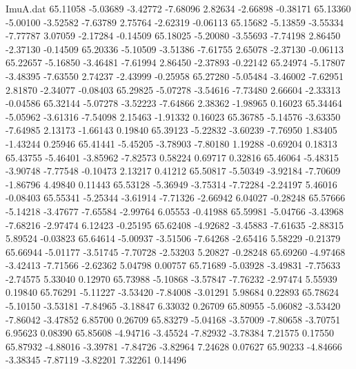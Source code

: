 \begin{filecontents}{ImuA.dat}
  65.11058   -5.03689   -3.42772   -7.68096    2.82634   -2.66898   -0.38171
  65.13360   -5.00100   -3.52582   -7.63789    2.75764   -2.62319   -0.06113
  65.15682   -5.13859   -3.55334   -7.77787    3.07059   -2.17284   -0.14509
  65.18025   -5.20080   -3.55693   -7.74198    2.86450   -2.37130   -0.14509
  65.20336   -5.10509   -3.51386   -7.61755    2.65078   -2.37130   -0.06113
  65.22657   -5.16850   -3.46481   -7.61994    2.86450   -2.37893   -0.22142
  65.24974   -5.17807   -3.48395   -7.63550    2.74237   -2.43999   -0.25958
  65.27280   -5.05484   -3.46002   -7.62951    2.81870   -2.34077   -0.08403
  65.29825   -5.07278   -3.54616   -7.73480    2.66604   -2.33313   -0.04586
  65.32144   -5.07278   -3.52223   -7.64866    2.38362   -1.98965    0.16023
  65.34464   -5.05962   -3.61316   -7.54098    2.15463   -1.91332    0.16023
  65.36785   -5.14576   -3.63350   -7.64985    2.13173   -1.66143    0.19840
  65.39123   -5.22832   -3.60239   -7.76950    1.83405   -1.43244    0.25946
  65.41441   -5.45205   -3.78903   -7.80180    1.19288   -0.69204    0.18313
  65.43755   -5.46401   -3.85962   -7.82573    0.58224    0.69717    0.32816
  65.46064   -5.48315   -3.90748   -7.77548   -0.10473    2.13217    0.41212
  65.50817   -5.50349   -3.92184   -7.70609   -1.86796    4.49840    0.11443
  65.53128   -5.36949   -3.75314   -7.72284   -2.24197    5.46016   -0.08403
  65.55341   -5.25344   -3.61914   -7.71326   -2.66942    6.04027   -0.28248
  65.57666   -5.14218   -3.47677   -7.65584   -2.99764    6.05553   -0.41988
  65.59981   -5.04766   -3.43968   -7.68216   -2.97474    6.12423   -0.25195
  65.62408   -4.92682   -3.45883   -7.61635   -2.88315    5.89524   -0.03823
  65.64614   -5.00937   -3.51506   -7.64268   -2.65416    5.58229   -0.21379
  65.66944   -5.01177   -3.51745   -7.70728   -2.53203    5.20827   -0.28248
  65.69260   -4.97468   -3.42413   -7.71566   -2.62362    5.04798    0.00757
  65.71689   -5.03928   -3.49831   -7.75633   -2.74575    5.33040    0.12970
  65.73988   -5.10868   -3.57847   -7.76232   -2.97474    5.55939    0.19840
  65.76291   -5.11227   -3.53420   -7.84008   -3.01291    5.98684    0.22893
  65.78624   -5.10150   -3.53181   -7.84965   -3.18847    6.33032    0.26709
  65.80955   -5.06082   -3.53420   -7.86042   -3.47852    6.85700    0.26709
  65.83279   -5.04168   -3.57009   -7.80658   -3.70751    6.95623    0.08390
  65.85608   -4.94716   -3.45524   -7.82932   -3.78384    7.21575    0.17550
  65.87932   -4.88016   -3.39781   -7.84726   -3.82964    7.24628    0.07627
  65.90233   -4.84666   -3.38345   -7.87119   -3.82201    7.32261    0.14496

\end{filecontents}
